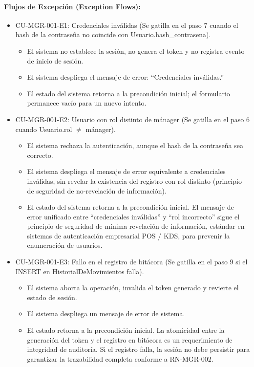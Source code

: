 \paragraph{Flujos de Excepción (Exception Flows):}
\begin{itemize}
    \item CU-MGR-001-E1: Credenciales inválidas (Se gatilla en el paso 7 cuando el hash de la contraseña no coincide con Usuario.hash\_contrasena).
    \begin{itemize}
        \item El sistema no establece la sesión, no genera el token y no registra evento de inicio de sesión.
        \item El sistema despliega el mensaje de error: ``Credenciales inválidas.''
        \item El estado del sistema retorna a la precondición inicial; el formulario permanece vacío para un nuevo intento.
    \end{itemize}
    \item CU-MGR-001-E2: Usuario con rol distinto de mánager (Se gatilla en el paso 6 cuando Usuario.rol $\neq$ mánager).
    \begin{itemize}
        \item El sistema rechaza la autenticación, aunque el hash de la contraseña sea correcto.
        \item El sistema despliega el mensaje de error equivalente a credenciales inválidas, sin revelar la existencia del registro con rol distinto (principio de seguridad de no-revelación de información).
        \item El estado del sistema retorna a la precondición inicial. El mensaje de error unificado entre ``credenciales inválidas'' y ``rol incorrecto'' sigue el principio de seguridad de mínima revelación de información, estándar en sistemas de autenticación empresarial POS / KDS, para prevenir la enumeración de usuarios.
    \end{itemize}
    \item CU-MGR-001-E3: Fallo en el registro de bitácora (Se gatilla en el paso 9 si el INSERT en HistorialDeMovimientos falla).
    \begin{itemize}
        \item El sistema aborta la operación, invalida el token generado y revierte el estado de sesión.
        \item El sistema despliega un mensaje de error de sistema.
        \item El estado retorna a la precondición inicial. La atomicidad entre la generación del token y el registro en bitácora es un requerimiento de integridad de auditoría. Si el registro falla, la sesión no debe persistir para garantizar la trazabilidad completa conforme a RN-MGR-002.
    \end{itemize}
\end{itemize}

